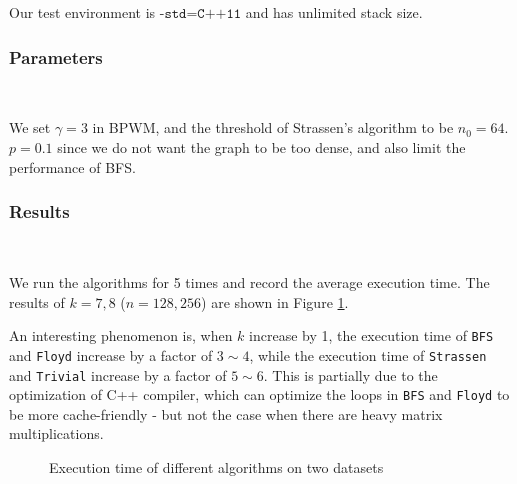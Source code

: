 \documentclass[11pt]{article}
\theoremstyle{plain}
\begin{document}
Our test environment is $\texttt{-std=C++11}$ and has unlimited stack size. 

\subsubsection{Parameters}\

We set $\gamma=3$ in BPWM, and the threshold of Strassen's algorithm to be $n_0=64$. $p=0.1$ since we do not want the graph to be too dense, and also limit the performance of BFS.

\subsubsection{Results}\

We run the algorithms for 5 times and record the average execution time. The results of $k=7,8$ ($n=128,256$) are shown in Figure \ref{fig:et}. 

An interesting phenomenon is, when $k$ increase by 1, the execution time of \texttt{BFS} and \texttt{Floyd} increase by a factor of $3\sim 4$, while the execution time of \texttt{Strassen} and \texttt{Trivial} increase by a factor of $5\sim 6$. This is partially due to the optimization of C++ compiler, which can optimize the loops in \texttt{BFS} and \texttt{Floyd} to be more cache-friendly - but not the case when there are heavy matrix multiplications.

\begin{figure}[ht]
    \centering
    \caption{Execution time of different algorithms on two datasets}
    \label{fig:et}
\end{figure}
\end{document}
